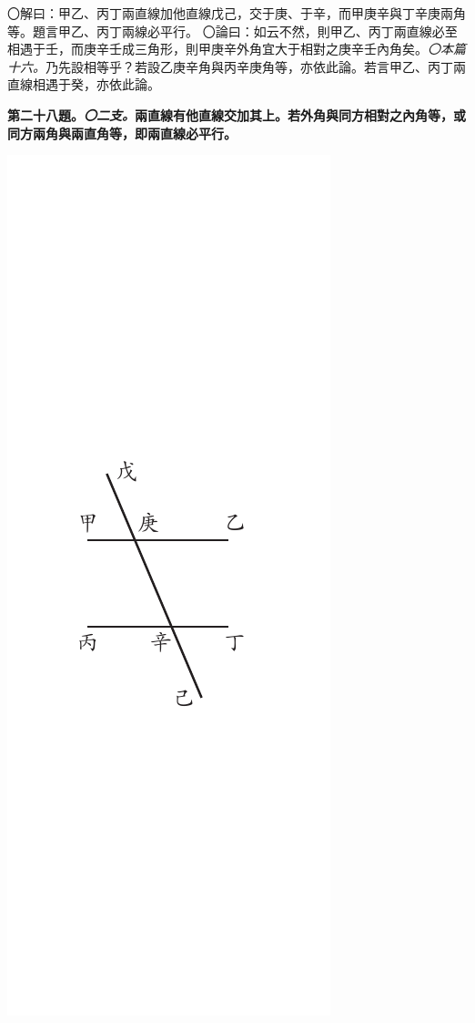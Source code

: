 \documentclass[12pt,b5paper,landscape]{article}
\newcommand{\ccom}[1]{{\footnotesize \emph{〇#1}}}
\newcommand{\bcom}[1]{〇#1}
\newcommand{\cthm}[1]{{
\vspace{8pt}

\bfseries #1}}
\begin{document}
\begin{multicols}{2}
\begin{center}
\end{center}
\bcom{解曰：甲乙、丙丁兩直線加他直線戊己，交于庚、于辛，而甲庚辛與丁辛庚兩角等。題言甲乙、丙丁兩線必平行。}
\bcom{論曰：如云不然，則甲乙、丙丁兩直線必至相遇于壬，而庚辛壬成三角形，則甲庚辛外角宜大于相對之庚辛壬內角矣。\ccom{本篇十六。}乃先設相等乎？若設乙庚辛角與丙辛庚角等，亦依此論。若言甲乙、丙丁兩直線相遇于癸，亦依此論。}

\cthm{第二十八題。\ccom{二支。}兩直線有他直線交加其上。若外角與同方相對之內角等，或同方兩角與兩直角等，即兩直線必平行。}

\begin{center}
      \includegraphics[angle=90]{eu75}
\end{center}


\end{multicols}
\end{document}
